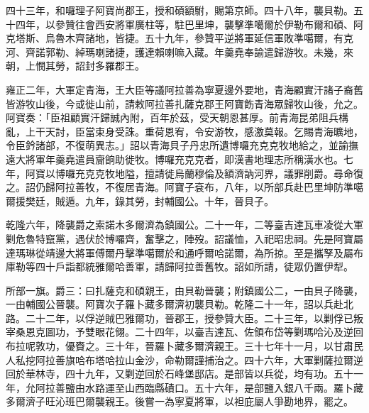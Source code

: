 \begin{pinyinscope}
四十三年，和囉理子阿寶尚郡王，授和碩額駙，賜第京師。四十八年，襲貝勒。五十四年，以參贊往會西安將軍廣柱等，駐巴里坤，襲擊準噶爾於伊勒布爾和碩、阿克塔斯、烏魯木齊諸地，皆捷。五十九年，參贊平逆將軍延信軍敗準噶爾，有克河、齊諾郭勒、綽瑪喇諸捷，護達賴喇嘛入藏。年羹堯奉諭遣歸游牧。未幾，來朝，上憫其勞，詔封多羅郡王。

雍正二年，大軍定青海，王大臣等議阿拉善為寧夏邊外要地，青海顧實汗諸子裔舊皆游牧山後，今或徙山前，請敕阿拉善扎薩克郡王阿寶飭青海眾歸牧山後，允之。阿寶奏：「臣祖顧實汗歸誠內附，百年於茲，受天朝恩甚厚。前青海昆弟阻兵構亂，上干天討，臣當束身受誅。重荷恩宥，令安游牧，感激莫報。乞賜青海曠地，令臣鈐諸部，不復萌異志。」詔以青海貝子丹忠所遺博囉充克克牧地給之，並諭撫遠大將軍年羹堯遣員齎餉助徙牧。博囉充克克者，即漢書地理志所稱潢水也。七年，阿寶以博囉充克克牧地隘，擅請徙烏蘭穆倫及額濟訥河界，議罪削爵。尋命復之。詔仍歸阿拉善牧，不復居青海。阿寶子袞布，八年，以所部兵赴巴里坤防準噶爾援樊廷，賊遁。九年，錄其勞，封輔國公。十年，晉貝子。

乾隆六年，降襲爵之索諾木多爾濟為鎮國公。二十一年，二等臺吉達瓦車凌從大軍剿危魯特竄黨，遇伏於博囉齊，奮擊之，陣歿。詔議恤，入祀昭忠祠。先是阿寶屬達瑪琳從靖邊大將軍傅爾丹擊準噶爾於和通呼爾哈諾爾，為所掠。至是攜孥及屬布庫勒等四十戶詣都統雅爾哈善軍，請歸阿拉善舊牧。詔如所請，徒眾仍置伊犁。

所部一旗。爵三：曰扎薩克和碩親王，由貝勒晉襲；附鎮國公二，一由貝子降襲，一由輔國公晉襲。阿寶次子羅卜藏多爾濟初襲貝勒。乾隆二十一年，詔以兵赴北路。二十二年，以俘逆賊巴雅爾功，晉郡王，授參贊大臣。二十三年，以剿俘已叛宰桑恩克圖功，予雙眼花翎。二十四年，以臺吉達瓦、佐領布岱等剿瑪哈沁及逆回布拉呢敦功，優賚之。三十年，晉羅卜藏多爾濟親王。三十七年十一月，以甘肅民人私挖阿拉善旗哈布塔哈拉山金沙，命勒爾謹捕治之。四十六年，大軍剿薩拉爾逆回於華林寺，四十九年，又剿逆回於石峰堡邸店。是部皆以兵從，均有功。五十一年，允阿拉善鹽由水路運至山西臨縣磧口。五十六年，是部鹽入銀八千兩。羅卜藏多爾濟子旺沁班巴爾襲親王。後嘗一為寧夏將軍，以袒庇屬人爭勘地界，罷之。


\end{pinyinscope}
